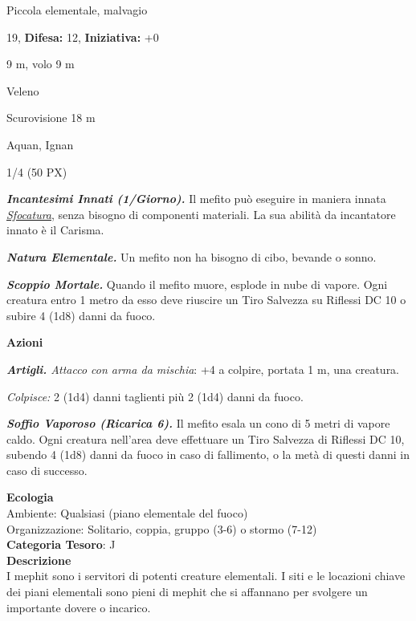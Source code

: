 \begin{multicols}{2}
{
\noindent
\begin{description}[noitemsep, topsep=0pt, parsep=0pt, partopsep=0pt, leftmargin=0cm, labelwidth=2.2cm]
	\item[\textbf{Taglia/Tipo:}] Piccola elementale, malvagio
	\item[\textbf{Caratt.:}] 
	\item[\textbf{Punti Ferita:}] 19,  \textbf{Difesa:} 12,  \textbf{Iniziativa:} +0
	\item[\textbf{Movimento:}] 9 m, volo 9 m
	\item[\textbf{Tiri Salvez.:}] 
	\item[\textbf{Imm. Danni:}] Veleno
	\item[\textbf{Sensi:}] Scurovisione 18 m
	\item[\textbf{Linguaggi:}] Aquan, Ignan
	\item[\textbf{Sfida:}] 1/4 (50 PX)\smallskip
\end{description}

\emph{\textbf{Incantesimi Innati (1/Giorno).}} Il mefito può eseguire in maniera innata \emph{\hyperlink{Sfocatura}{Sfocatura}}, senza bisogno di componenti materiali. La sua abilità da incantatore innato è il Carisma.

\emph{\textbf{Natura Elementale.}} Un mefito non ha bisogno di cibo, bevande o sonno.

\emph{\textbf{Scoppio Mortale.}} Quando il mefito muore, esplode in nube di vapore. Ogni creatura entro 1 metro da esso deve riuscire un Tiro Salvezza su Riflessi DC 10 o subire 4 (1d8) danni da fuoco.

\textbf{Azioni}

\emph{\textbf{Artigli.} Attacco con arma da mischia}: +4 a colpire, portata 1 m, una creatura.

\emph{Colpisce:} 2 (1d4) danni taglienti più 2 (1d4) danni da fuoco.

\emph{\textbf{Soffio Vaporoso (Ricarica 6).}} Il mefito esala un cono di 5 metri di vapore caldo. Ogni creatura nell'area deve effettuare un Tiro Salvezza di Riflessi DC 10, subendo 4 (1d8) danni da fuoco in caso di fallimento, o la metà di questi danni in caso di successo.

\textbf{Ecologia}\\
Ambiente: Qualsiasi (piano elementale del fuoco)\\
Organizzazione: Solitario, coppia, gruppo (3-6) o stormo (7-12)\\
\textbf{Categoria Tesoro}: J\\
\textbf{Descrizione}\\
I mephit sono i servitori di potenti creature elementali. I siti e le locazioni chiave dei piani elementali sono pieni di mephit che si affannano per svolgere un importante dovere o incarico.

}
\end{multicols}

